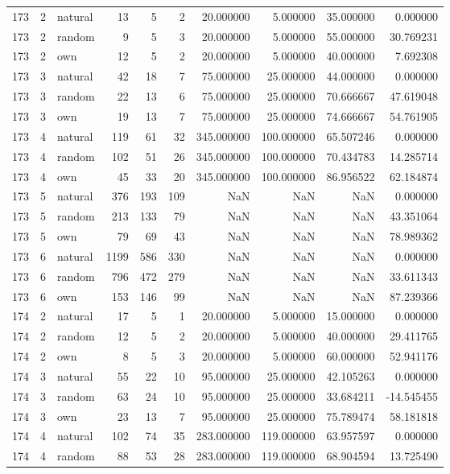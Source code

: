 \begin{table}[htbp]
\begin{tabular}{rrlrrrrrrr}
173 & 2 & natural & 13 & 5 & 2 & 20.000000 & 5.000000 & 35.000000 & 0.000000 \\
173 & 2 & random & 9 & 5 & 3 & 20.000000 & 5.000000 & 55.000000 & 30.769231 \\
173 & 2 & own & 12 & 5 & 2 & 20.000000 & 5.000000 & 40.000000 & 7.692308 \\
173 & 3 & natural & 42 & 18 & 7 & 75.000000 & 25.000000 & 44.000000 & 0.000000 \\
173 & 3 & random & 22 & 13 & 6 & 75.000000 & 25.000000 & 70.666667 & 47.619048 \\
173 & 3 & own & 19 & 13 & 7 & 75.000000 & 25.000000 & 74.666667 & 54.761905 \\
173 & 4 & natural & 119 & 61 & 32 & 345.000000 & 100.000000 & 65.507246 & 0.000000 \\
173 & 4 & random & 102 & 51 & 26 & 345.000000 & 100.000000 & 70.434783 & 14.285714 \\
173 & 4 & own & 45 & 33 & 20 & 345.000000 & 100.000000 & 86.956522 & 62.184874 \\
173 & 5 & natural & 376 & 193 & 109 & NaN & NaN & NaN & 0.000000 \\
173 & 5 & random & 213 & 133 & 79 & NaN & NaN & NaN & 43.351064 \\
173 & 5 & own & 79 & 69 & 43 & NaN & NaN & NaN & 78.989362 \\
173 & 6 & natural & 1199 & 586 & 330 & NaN & NaN & NaN & 0.000000 \\
173 & 6 & random & 796 & 472 & 279 & NaN & NaN & NaN & 33.611343 \\
173 & 6 & own & 153 & 146 & 99 & NaN & NaN & NaN & 87.239366 \\
174 & 2 & natural & 17 & 5 & 1 & 20.000000 & 5.000000 & 15.000000 & 0.000000 \\
174 & 2 & random & 12 & 5 & 2 & 20.000000 & 5.000000 & 40.000000 & 29.411765 \\
174 & 2 & own & 8 & 5 & 3 & 20.000000 & 5.000000 & 60.000000 & 52.941176 \\
174 & 3 & natural & 55 & 22 & 10 & 95.000000 & 25.000000 & 42.105263 & 0.000000 \\
174 & 3 & random & 63 & 24 & 10 & 95.000000 & 25.000000 & 33.684211 & -14.545455 \\
174 & 3 & own & 23 & 13 & 7 & 95.000000 & 25.000000 & 75.789474 & 58.181818 \\
174 & 4 & natural & 102 & 74 & 35 & 283.000000 & 119.000000 & 63.957597 & 0.000000 \\
174 & 4 & random & 88 & 53 & 28 & 283.000000 & 119.000000 & 68.904594 & 13.725490 \\

\end{tabular}
\end{table}
